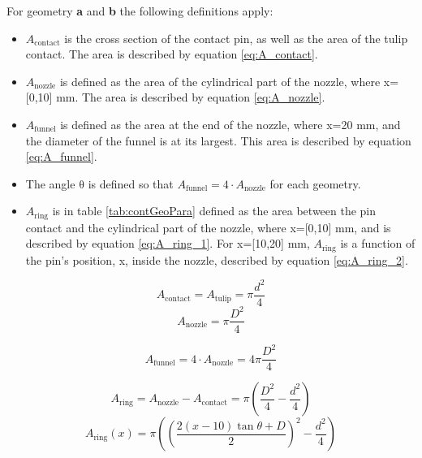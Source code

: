 \documentclass[10pt,b5paper,twoside]{article}
\begin{document}
For geometry \textbf{a} and \textbf{b} the following definitions apply:
\begin{itemize}
\item $A_\mathrm{{contact}}$ is the cross section of the contact pin, as well as the area of the tulip contact. The area is described by equation \eqref{eq:A_contact}.

\item $A_\mathrm{{nozzle}}$ is defined as the area of the cylindrical part of the nozzle, where x=[0,10] mm. The area is described by equation \eqref{eq:A_nozzle}.

\item $A_\mathrm{{funnel}}$ is defined as the area at the end of the nozzle, where x=20 mm, and the diameter of the funnel is at its largest. This area is described by equation \eqref{eq:A_funnel}.

\item The angle $\mathrm{\theta}$ is defined so that $A_\mathrm{{funnel}}=4 \cdot A_\mathrm{{nozzle}}$ for each geometry.

\item $A_\mathrm{{ring}}$ is in table \ref{tab:contGeoPara} defined as the area between the pin contact and the cylindrical part of the nozzle, where x=[0,10] mm, and is described by equation \eqref{eq:A_ring_1}. For x=[10,20] mm, $A_\mathrm{{ring}}$ is a function of the pin's position, x, inside the nozzle, described by equation \eqref{eq:A_ring_2}.
\end{itemize}

\begin{equation} \label{eq:A_contact}
A_\mathrm{{contact}}=A_\mathrm{{tulip}}=\pi \frac{d^2}{4}
\end{equation}
\begin{equation} \label{eq:A_nozzle}
A_\mathrm{{nozzle}}=\pi \frac{D^2}{4}
\end{equation}

\begin{equation} \label{eq:A_funnel}
A_\mathrm{{funnel}}=4 \cdot A_\mathrm{{nozzle}}=4\pi \frac{D^2}{4}
\end{equation}

\begin{equation} \label{eq:A_ring_1}
A_\mathrm{{ring}}=A_\mathrm{{nozzle}}-A_\mathrm{{contact}}=\pi\left( \frac{D^2}{4}-\frac{d^2}{4}\right)
\end{equation}
\begin{equation} \label{eq:A_ring_2}
A_\mathrm{{ring}}(x)=\pi\left( \left(\frac{2(x-10)\tan \theta + D}{2}\right)^2-\frac{d^2}{4}\right)
\end{equation}
\end{document}
